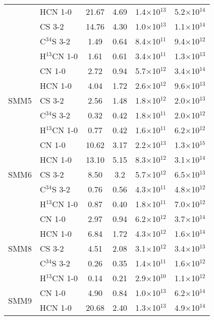 \documentclass{aa}
\begin{document}
\begin{table*}
\begin{tabular}{l l c c c c}
     {} & HCN 1-0 & 21.67 & 4.69 & 1.4$\times$10$^{13}$ & 5.2$\times$10$^{14}$\\
      {} & CS 3-2 & 14.76 & 4.30 & 1.0$\times$10$^{13}$ & 1.1$\times$10$^{14}$\\
       {} & C$^{34}$S 3-2 & 1.49 & 0.64 & 8.4$\times$10$^{11}$ & 9.4$\times$10$^{12}$\\
        {} & H$^{13}$CN 1-0 & 1.61 & 0.61 & 3.4$\times$10$^{11}$ & 1.3$\times$10$^{13}$\\ 
        \hline \multirow{5}{*}{SMM5} & CN 1-0 & 2.72 & 0.94 & 5.7$\times$10$^{12}$ & 3.4$\times$10$^{14}$\\
         {} & HCN 1-0 & 4.04 & 1.72 & 2.6$\times$10$^{12}$ & 9.6$\times$10$^{13}$\\ 
         {} & CS 3-2 & 2.56 & 1.48 & 1.8$\times$10$^{12}$ & 2.0$\times$10$^{13}$\\ 
{} & C$^{34}$S 3-2 & 0.32 & 0.42 & 1.8$\times$10$^{11}$ & 2.0$\times$10$^{12}$ \\ 
{} & H$^{13}$CN 1-0 & 0.77 & 0.42 & 1.6$\times$10$^{11}$ & 6.2$\times$10$^{12}$ \\
 \hline \multirow{5}{*}{SMM6} & CN 1-0 & 10.62 & 3.17 & 2.2$\times$10$^{13}$ & 1.3$\times$10$^{15}$\\
  {} & HCN 1-0 & 13.10 & 5.15 & 8.3$\times$10$^{12}$ & 3.1$\times$10$^{14}$\\ 
  {} & CS 3-2 & 8.50 & 3.2 & 5.7$\times$10$^{12}$ & 6.5$\times$10$^{13}$\\ 
  {} & C$^{34}$S 3-2 & 0.76 & 0.56 & 4.3$\times$10$^{11}$ & 4.8$\times$10$^{12}$ \\ 
  {} & H$^{13}$CN 1-0 & 0.87 & 0.40 & 1.8$\times$10$^{11}$ & 7.0$\times$10$^{12}$\\
   \hline \multirow{5}{*}{SMM8} & CN 1-0 & 2.97 & 0.94 & 6.2$\times$10$^{12}$ & 3.7$\times$10$^{14}$\\ 
   {} & HCN 1-0 & 6.84 & 1.72 & 4.3$\times$10$^{12}$ & 1.6$\times$10$^{14}$ \\ 
   {} & CS 3-2 & 4.51 & 2.08 & 3.1$\times$10$^{12}$ & 3.4$\times$10$^{13}$ \\
    {} & C$^{34}$S 3-2 & 0.26 & 0.35 & 1.4$\times$10$^{11}$ & 1.6$\times$10$^{12}$\\
     {} & H$^{13}$CN 1-0 & 0.14 & 0.21 & 2.9$\times$10$^{10}$ & 1.1$\times$10$^{12}$\\
      \hline \multirow{5}{*}{SMM9} & CN 1-0 & 4.90 & 0.84 & 1.0$\times$10$^{13}$ & 6.2$\times$10$^{14}$\\
       {} & HCN 1-0 & 20.68 & 2.40 & 1.3$\times$10$^{13}$ & 4.9$\times$10$^{14}$ \\ 

\end{tabular}
\end{table*}
\end{document}
